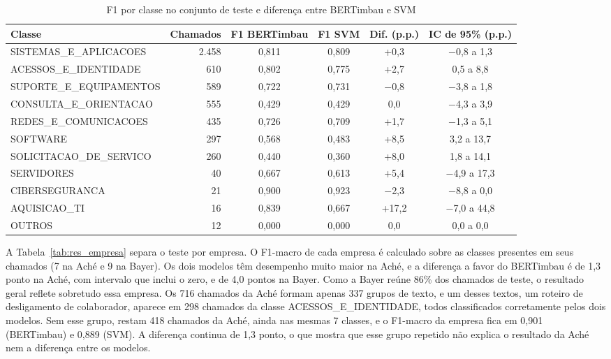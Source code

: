 \documentclass[
    12pt,                %
    openright,           %
    oneside,             %
    a4paper,             %
    english,             %
    brazil               %
]{abntex2}
\begin{document}
\begin{table}[htb]
  \centering
  \caption{F1 por classe no conjunto de teste e diferença entre BERTimbau e SVM}
  \label{tab:res_classe}
  \small
  \begin{tabular}{p{4.9cm}rcccc}
    \toprule
    Classe & Chamados & F1 BERTimbau & F1 SVM & Dif. (p.p.) & IC de 95\% (p.p.) \\
    \midrule
SISTEMAS\_E\_APLICACOES & 2.458 & 0,811 & 0,809 & +0,3 & $-$0,8 a 1,3 \\
ACESSOS\_E\_IDENTIDADE & 610 & 0,802 & 0,775 & +2,7 & 0,5 a 8,8 \\
SUPORTE\_E\_EQUIPAMENTOS & 589 & 0,722 & 0,731 & $-$0,8 & $-$3,8 a 1,8 \\
CONSULTA\_E\_ORIENTACAO & 555 & 0,429 & 0,429 & 0,0 & $-$4,3 a 3,9 \\
REDES\_E\_COMUNICACOES & 435 & 0,726 & 0,709 & +1,7 & $-$1,3 a 5,1 \\
SOFTWARE & 297 & 0,568 & 0,483 & +8,5 & 3,2 a 13,7 \\
SOLICITACAO\_DE\_SERVICO & 260 & 0,440 & 0,360 & +8,0 & 1,8 a 14,1 \\
SERVIDORES & 40 & 0,667 & 0,613 & +5,4 & $-$4,9 a 17,3 \\
CIBERSEGURANCA & 21 & 0,900 & 0,923 & $-$2,3 & $-$8,8 a 0,0 \\
AQUISICAO\_TI & 16 & 0,839 & 0,667 & +17,2 & $-$7,0 a 44,8 \\
OUTROS & 12 & 0,000 & 0,000 & 0,0 & 0,0 a 0,0 \\
    \bottomrule
  \end{tabular}
\end{table}

A Tabela~\ref{tab:res_empresa} separa o teste por empresa. O F1-macro de cada empresa é calculado sobre as classes presentes em seus chamados (7 na Aché e 9 na Bayer). Os dois modelos têm desempenho muito maior na Aché, e a diferença a favor do BERTimbau é de 1,3 ponto na Aché, com intervalo que inclui o zero, e de 4,0 pontos na Bayer. Como a Bayer reúne 86\% dos chamados de teste, o resultado geral reflete sobretudo essa empresa. Os 716 chamados da Aché formam apenas 337 grupos de texto, e um desses textos, um roteiro de desligamento de colaborador, aparece em 298 chamados da classe ACESSOS\_E\_IDENTIDADE, todos classificados corretamente pelos dois modelos. 
Sem esse grupo, restam 418 chamados da Aché, ainda nas mesmas 7 classes, e o F1-macro da empresa fica em 0,901 (BERTimbau) e 0,889 (SVM). A diferença continua de 1,3 ponto, o que mostra que esse grupo repetido não explica o resultado da Aché nem a diferença entre os modelos.
\end{document}
